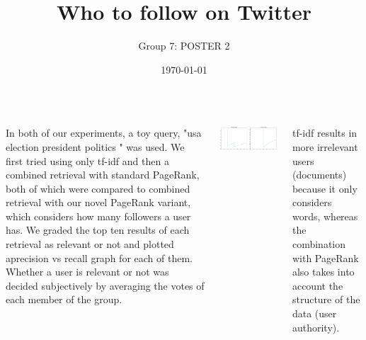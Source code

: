 \documentclass[24pt, a2papper, portrait]{tikzposter}
\title{Who to follow on Twitter}
\author{Group 7: POSTER 2}
\date{\today}
\begin{document}
\maketitle

\begin{columns}
     {
        In both of our experiments, a toy query, "usa election president politics " was
        used. We first tried using only tf-idf and then a combined retrieval with
        standard PageRank, both of which were compared to combined retrieval with our
        novel PageRank variant, which considers how many followers a user has. We graded
        the top ten results of each retrieval as relevant or not and plotted aprecision
        vs recall graph for each of them.  Whether a user is relevant or not was decided
        subjectively by averaging the votes of each member of the group.
    }

     {
        \begin{tikzfigure}
            \includegraphics[width=1\linewidth]{images/exptfidf.png}
        \end{tikzfigure}
        tf-idf results in more irrelevant users (documents) because it only
        considers words, whereas the combination with PageRank also takes into
        account the structure of the data (user authority).
    }

\end{columns}
\end{document}
